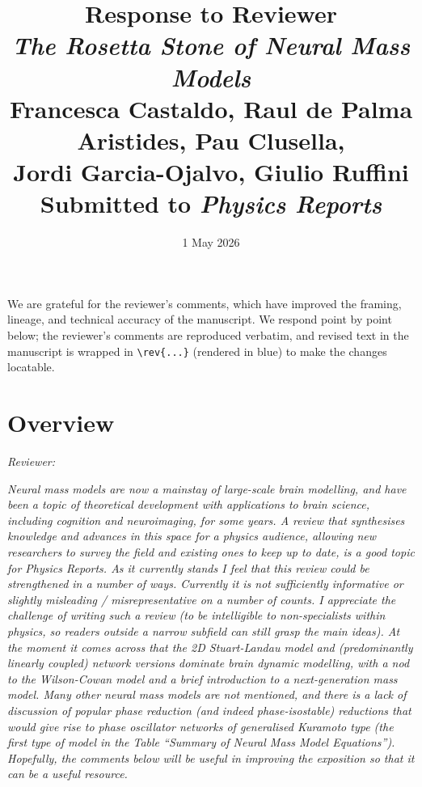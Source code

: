 \documentclass[12pt,a4paper]{article}
\title{Response to Reviewer\\[0.4em]
\large \emph{The Rosetta Stone of Neural Mass Models}\\[0.2em]
\normalsize Francesca Castaldo, Raul de Palma Aristides, Pau Clusella,\\
Jordi Garcia-Ojalvo, Giulio Ruffini\\[0.3em]
\normalsize Submitted to \textit{Physics Reports}}
\author{}
\date{1 May 2026}
\newcommand{\reviewercomment}[1]{\par\smallskip\noindent\textit{Reviewer:}\par\smallskip\begingroup\itshape #1\par\endgroup\smallskip}
\begin{document}
\maketitle

We are grateful for the reviewer's comments, which have improved the framing, lineage, and technical accuracy of the manuscript. We respond point by point below; the reviewer's comments are reproduced verbatim, and revised text in the manuscript is wrapped in \Verb|\rev{...}| (rendered in blue) to make the changes locatable.

\section*{Overview}

\reviewercomment{Neural mass models are now a mainstay of large-scale brain modelling, and have been a topic of theoretical development with applications to brain science, including cognition and neuroimaging, for some years. A review that synthesises knowledge and advances in this space for a physics audience, allowing new researchers to survey the field and existing ones to keep up to date, is a good topic for Physics Reports. As it currently stands I feel that this review could be strengthened in a number of ways. Currently it is not sufficiently informative or slightly misleading / misrepresentative on a number of counts. I appreciate the challenge of writing such a review (to be intelligible to non-specialists within physics, so readers outside a narrow subfield can still grasp the main ideas). At the moment it comes across that the 2D Stuart-Landau model and (predominantly linearly coupled) network versions dominate brain dynamic modelling, with a nod to the Wilson-Cowan model and a brief introduction to a next-generation mass model. Many other neural mass models are not mentioned, and there is a lack of discussion of popular phase reduction (and indeed phase-isostable) reductions that would give rise to phase oscillator networks of generalised Kuramoto type (the first type of model in the Table ``Summary of Neural Mass Model Equations''). Hopefully, the comments below will be useful in improving the exposition so that it can be a useful resource.}
\end{document}
